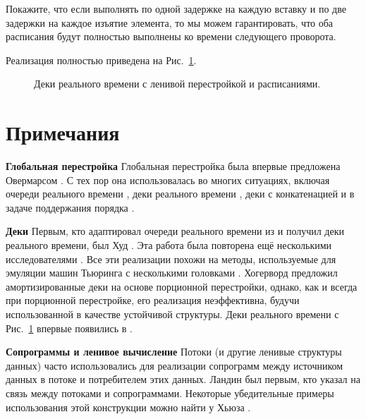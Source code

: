 \begin{exercise}\label{ex:8.7}
  Покажите, что если выполнять по одной задержке на каждую вставку и
  по две задержки на каждое изъятие элемента, то мы можем
  гарантировать, что оба расписания будут полностью выполнены ко
  времени следующего проворота.
\end{exercise}

Реализация полностью приведена на Рис.~\ref{fig:8.4}.

\begin{figure}
  \centering

  \caption{Деки реального времени с ленивой перестройкой и расписаниями.}
  \label{fig:8.4}
\end{figure}

\section{Примечания}
\label{sc:8.5}

\noindent
\textbf{Глобальная перестройка} Глобальная перестройка была впервые
предложена Овермарсом \cite{Overmars1983}. С тех пор она
использовалась во многих ситуациях, включая очереди реального времени
\cite{HoodMelville1981}, деки реального времени \cite{Hood1982,
  GajewskaTarjan1986, Sarnak1986, ChuangGoldberg1993}, деки с
конкатенацией \cite{BuchsbaumTarjan1995} и в задаче поддержания
порядка \cite{DietzSleator1987}.

\noindent
\textbf{Деки} Первым, кто адаптировал очереди реального времени из
\cite{HoodMelville1981} и получил деки реального времени, был Худ
\cite{Hood1982}. Эта работа была повторена ещё несколькими
исследователями \cite{GajewskaTarjan1986, Sarnak1986,
  ChuangGoldberg1993}. Все эти реализации похожи на методы,
используемые для эмуляции машин Тьюринга с несколькими головками
\cite{Stoss1970, FischerMeyerRosenberg1972,
  LeongSeiferas1981}. Хогерворд \cite{Hoogerwoord1992} предложил
амортизированные деки на основе порционной перестройки, однако, как и
всегда при порционной перестройке, его реализация
неэффективна, будучи использованной в качестве устойчивой структуры. Деки
реального времени с Рис.~\ref{fig:8.4} впервые появились в
\cite{Okasaki1995c}.

\noindent
\textbf{Сопрограммы и ленивое вычисление} Потоки (и другие ленивые
структуры данных) часто использовались для реализации сопрограмм между
источником данных в потоке и потребителем этих данных. Ландин
\cite{Landin1965} был первым, кто указал на связь между потоками и
сопрограммами. Некоторые убедительные примеры использования этой
конструкции можно найти у Хьюза \cite{Hughes1989}.

